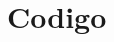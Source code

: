 \documentclass[a4paper,titlepage,10pt]{article}
\begin{document}

\maketitle

\section{Codigo}





\newpage



\newpage


\end{document}

